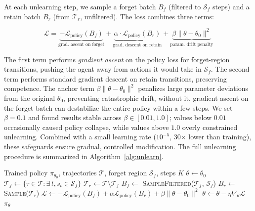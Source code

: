 \documentclass[sigconf]{acmart}
\begin{document}
At each unlearning step, we sample a forget batch $B_f$ (filtered to $\mathcal{S}_f$ steps) and a retain batch $B_r$ (from $\mathcal{T}_r$, unfiltered). The loss combines three terms:

\begin{equation}
    \mathcal{L} = \underbrace{-\mathcal{L}_{\text{policy}}(B_f)}_{\text{grad. ascent on forget}} + \underbrace{\alpha \cdot \mathcal{L}_{\text{policy}}(B_r)}_{\text{grad. descent on retain}} + \underbrace{\beta \|\theta - \theta_0\|^2}_{\text{param. drift penalty}}
\end{equation}

The first term performs \emph{gradient ascent} on the policy loss for forget-region transitions, pushing the agent away from actions it would take in $\mathcal{S}_f$. The second term performs standard gradient descent on retain transitions, preserving competence. The anchor term $\beta \|\theta - \theta_0\|^2$ penalizes large parameter deviations from the original $\theta_0$, preventing catastrophic drift, without it, gradient ascent on the forget batch can destabilize the entire policy within a few steps. We set $\beta = 0.1$ and found results stable across $\beta \in [0.01, 1.0]$; values below $0.01$ occasionally caused policy collapse, while values above $1.0$ overly constrained unlearning. Combined with a small learning rate ($10^{-5}$, 30$\times$ lower than training), these safeguards ensure gradual, controlled modification. The full unlearning procedure is summarized in Algorithm~\ref{alg:unlearn}.

\begin{algorithm}[t]
\caption{Trajectory-Selective Behavioral Unlearning}
\label{alg:unlearn}
\begin{algorithmic}[1]
\REQUIRE Trained policy $\pi_{\theta_0}$, trajectories $\mathcal{T}$, forget region $\mathcal{S}_f$, steps $K$
\STATE $\theta \leftarrow \theta_0$
\STATE $\mathcal{T}_f \leftarrow \{\tau \in \mathcal{T} : \exists\, t, s_t \in \mathcal{S}_f\}$
\STATE $\mathcal{T}_r \leftarrow \mathcal{T} \setminus \mathcal{T}_f$
    \STATE $B_f \leftarrow$ \textsc{SampleFiltered}($\mathcal{T}_f$, $\mathcal{S}_f$) 
    \STATE $B_r \leftarrow$ \textsc{Sample}($\mathcal{T}_r$) 
    \STATE $\mathcal{L} \leftarrow -\mathcal{L}_\text{policy}(B_f) + \alpha \mathcal{L}_\text{policy}(B_r) + \beta \|\theta - \theta_0\|^2$
    \STATE $\theta \leftarrow \theta - \eta \nabla_\theta \mathcal{L}$
\ENDFOR
\RETURN $\pi_\theta$
\end{algorithmic}
\end{algorithm}
\end{document}
